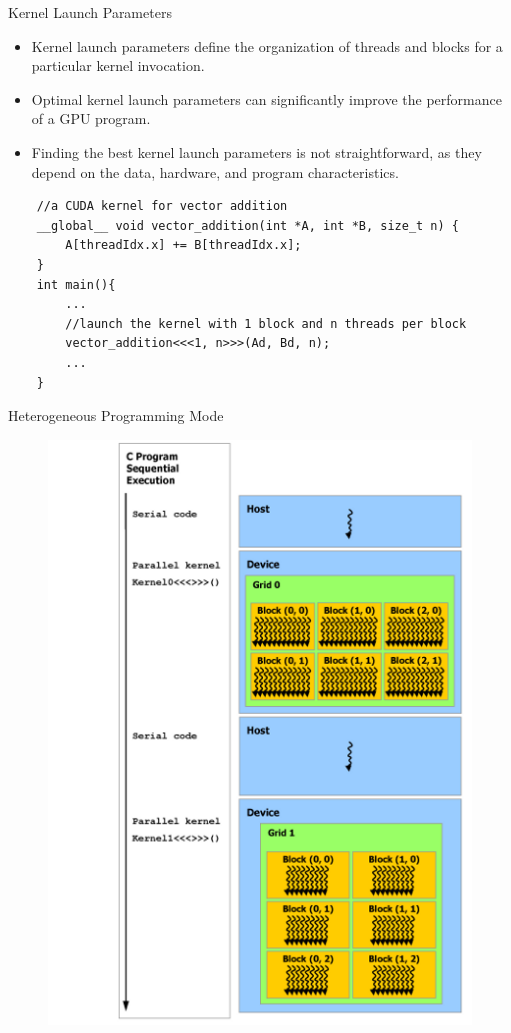\begin{frame}[fragile]{Kernel Launch Parameters}
	\begin{block}{}
        \begin{itemize}
            \item Kernel launch parameters define the organization of threads and blocks for a particular kernel invocation.
            \item Optimal kernel launch parameters can significantly improve the performance of a GPU program.
            \item Finding the best kernel launch parameters is not straightforward, as they depend on the data, 
            hardware, and program characteristics.
        \end{itemize}
        \begin{verbatim}
    //a CUDA kernel for vector addition
    __global__ void vector_addition(int *A, int *B, size_t n) {
        A[threadIdx.x] += B[threadIdx.x];
    }
    int main(){
        ...
        //launch the kernel with 1 block and n threads per block
        vector_addition<<<1, n>>>(Ad, Bd, n);
        ...
    }			
        \end{verbatim}
	\end{block}
\end{frame}

\begin{frame}{Heterogeneous Programming Mode}
    \begin{center}
        \begin{figure}[H]
            \includegraphics[scale=0.5]{figures/heterogeneous-programming.png}
        \end{figure}
    \end{center}
\end{frame}

